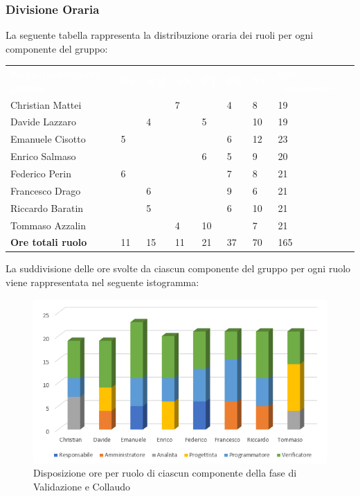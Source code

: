 \subsubsection{Divisione Oraria}
La seguente tabella rappresenta la distribuzione oraria dei ruoli per ogni componente del gruppo:
{
	\renewcommand{\arraystretch}{2}
	\begin{table}[h]
		\caption{Tabella della divisione oraria di Validazione e Collaudo}

	\begin{longtable}{ C{5cm} C{1cm} C{1cm} C{1cm} C{1cm} C{1cm} C{1cm} C{3cm}}
		\textcolor{white}{\textbf{Nome membro del gruppo}} & \textcolor{white}{\textbf{RE}} & \textcolor{white}{\textbf{AM}} & \textcolor{white}{\textbf{AN}} & \textcolor{white}{\textbf{PT}} & \textcolor{white}{\textbf{PR}} & \textcolor{white}{\textbf{VE}} & \textcolor{white}{\textbf{Ore complessive}}\\	
        
        Christian Mattei & & & 7 & & 4 & 8 & 19\\
        Davide Lazzaro & & 4 & & 5 & & 10 & 19\\
        Emanuele Cisotto & 5 & & & & 6 & 12 & 23\\ 
        Enrico Salmaso & & & & 6 & 5 & 9 & 20 \\
        Federico Perin & 6 & & & & 7 & 8 & 21\\
        Francesco Drago & & 6 & & & 9 & 6 & 21\\
        Riccardo Baratin & & 5 & & & 6 & 10 & 21\\
        Tommaso Azzalin & & & 4 & 10 & & 7 & 21\\
        \textbf{Ore totali ruolo} & 11 & 15 & 11 & 21 & 37 & 70 & 165\\
		
	\end{longtable}
\end{table}
}


La suddivisione delle ore svolte da ciascun componente del gruppo per ogni ruolo viene rappresentata nel seguente istogramma:

\begin{figure}[h!]
	\centering
	\caption{Disposizione ore per ruolo di ciascun componente della fase di Validazione e Collaudo}
	\includegraphics[scale=2.5]{sezioni/Istogrammi/IstogrammaValidazione.png}
\end{figure}

